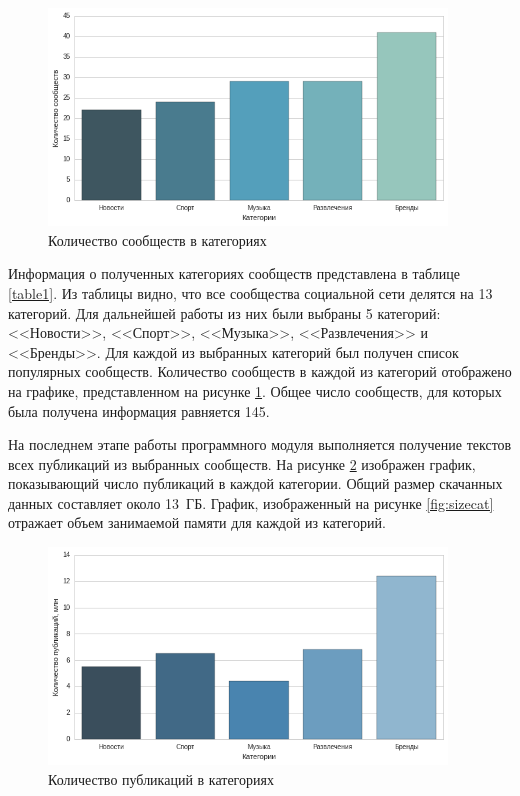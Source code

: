 \documentclass[a4paper]{report}
\begin{document}
	
	
	\begin{figure}[t]
		\centering
		\includegraphics[width=400px]
		{imgs/GroupInCat.png}
		\caption{Количество сообществ в категориях}
		\label{fig:groupincat}
	\end{figure} 
	
	Информация о полученных категориях сообществ представлена в таблице \ref{table1}. Из таблицы видно, что все сообщества социальной сети делятся на 13 категорий. Для дальнейшей работы из них были выбраны 5 категорий: <<Новости>>, <<Спорт>>, <<Музыка>>, <<Развлечения>> и <<Бренды>>. Для каждой из выбранных категорий был получен список популярных сообществ. Количество сообществ в каждой из категорий отображено на графике, представленном на рисунке \ref{fig:groupincat}. Общее число сообществ, для которых была получена информация равняется 145. 
	
	
	На последнем этапе работы программного модуля выполняется получение текстов всех публикаций из выбранных сообществ. На рисунке \ref{fig:numart} изображен график, показывающий число публикаций в каждой категории. 
	Общий размер скачанных данных составляет около 13~ГБ. 
	График, изображенный на рисунке \ref{fig:sizecat} отражает объем занимаемой памяти для каждой из категорий. 
	
	
	\begin{figure}[h]
		\centering
		\includegraphics[width=400px]
		{imgs/NumArticles.png}
		\caption{Количество публикаций в категориях}
		\label{fig:numart}
	\end{figure} 
	
\end{document}
